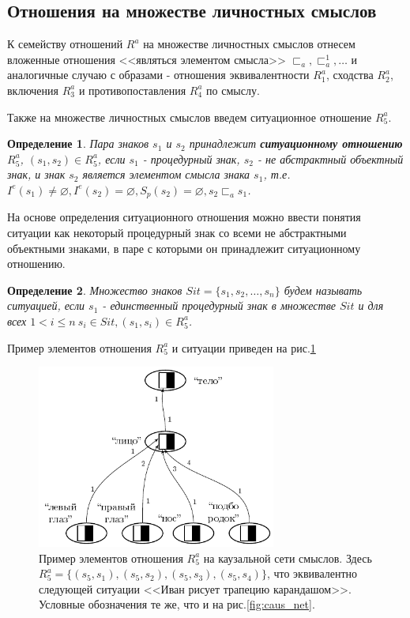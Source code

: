 \documentclass[12pt]{scrartcl}
\newtheorem{definition}{Определение}
\begin{document}
	\subsection{Отношения на множестве личностных смыслов}	
	К семейству отношений $R^a$ на множестве личностных смыслов отнесем вложенные отношения <<являться элементом смысла>> ${\sqsubset_a,\sqsubset_a^1,\dots}$ и аналогичные случаю с образами - отношения эквивалентности $R_1^a$, сходства $R_2^a$, включения $R_3^a$ и противопоставления $R_4^a$ по смыслу.
	
	Также на множестве личностных смыслов введем ситуационное отношение $R_5^a$.

	\begin{definition}
		Пара знаков $s_1$ и $s_2$ принадлежит \textbf{ситуационному отношению} $R_5^a$, $(s_1,s_2)\in R_5^a$, если $s_1$ - процедурный знак, $s_2$ - не абстрактный объектный знак, и знак $s_2$ является элементом смысла знака $s_1$, т.е. $I^e(s_1)\not = \varnothing, I^e(s_2) = \varnothing, S_p(s_2)=\varnothing, s_2\sqsubset_a s_1$.
	\end{definition}
	
	На основе определения ситуационного отношения можно ввести понятия ситуации как некоторый процедурный знак со всеми не абстрактными объектными знаками, в паре с которыми он принадлежит ситуационному отношению.
	
	\begin{definition}
		Множество знаков $Sit=\{s_1,s_2,\dots,s_n\}$ будем называть \textit{ситуацией}, если $s_1$ - единственный процедурный знак в множестве $Sit$ и для всех $1<i\leq n\ s_i\in Sit, (s_1,s_i)\in R_5^a$.
	\end{definition}
	
	Пример элементов отношения $R_5^a$ и ситуации приведен на рис.\ref{fig:mean_relat}

	\begin{figure}[h]
		\centering
		\includegraphics[width=0.7\textwidth,page=3]{examples/causnet/caus_net}
		\caption{Пример элементов отношения $R_5^a$ на каузальной сети смыслов. Здесь $R_5^a=\{(s_5,s_1),(s_5,s_2),(s_5,s_3),(s_5,s_4)\}$, что эквивалентно следующей ситуации <<Иван рисует трапецию карандашом>>. Условные обозначения те же, что и на рис.\ref{fig:caus_net}.}
		\label{fig:mean_relat}		
	\end{figure}
			
\end{document}
